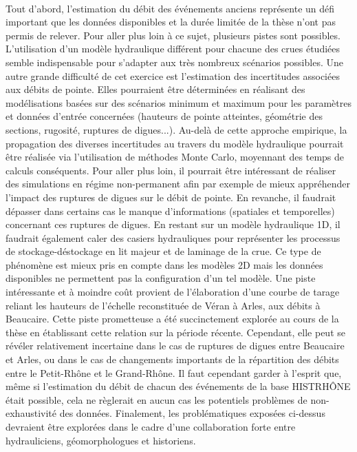 	\paragraph{} Tout d'abord, l'estimation du débit des événements anciens représente un défi important que les données disponibles et la durée limitée de la thèse n'ont pas permis de relever. Pour aller plus loin à ce sujet, plusieurs pistes sont possibles. L'utilisation d'un modèle hydraulique différent pour chacune des crues étudiées semble indispensable pour s'adapter aux très nombreux scénarios possibles. Une autre grande difficulté de cet exercice est l'estimation des incertitudes associées aux débits de pointe. Elles pourraient être déterminées en réalisant des modélisations basées sur des scénarios minimum et maximum pour les paramètres et données d'entrée concernées (hauteurs de pointe atteintes, géométrie des sections, rugosité, ruptures de digues...). Au-delà de cette approche empirique, la propagation des diverses incertitudes au travers du modèle hydraulique pourrait être réalisée via l'utilisation de méthodes Monte Carlo, moyennant des temps de calculs conséquents. Pour aller plus loin, il pourrait être intéressant de réaliser des simulations en régime non-permanent afin par exemple de mieux appréhender l'impact des ruptures de digues sur le débit de pointe. En revanche, il faudrait dépasser dans certains cas le manque d'informations (spatiales et temporelles) concernant ces ruptures de digues. En restant sur un modèle hydraulique 1D, il faudrait également caler des casiers hydrauliques pour représenter les processus de stockage-déstockage en lit majeur et de laminage de la crue. Ce type de phénomène est mieux pris en compte dans les modèles 2D mais les données disponibles ne permettent pas la configuration d'un tel modèle. Une piste intéressante et à moindre coût provient de l'élaboration d'une courbe de tarage reliant les hauteurs de l'échelle reconstituée de Véran à Arles, aux débits à Beaucaire. Cette piste prometteuse a été succinctement explorée au cours de la thèse en établissant cette relation sur la période récente. Cependant, elle peut se révéler relativement incertaine dans le cas de ruptures de digues entre Beaucaire et Arles, ou dans le cas de changements importants de la répartition des débits entre le Petit-Rhône et le Grand-Rhône. Il faut cependant garder à l'esprit que, même si l'estimation du débit de chacun des événements de la base HISTRHÔNE était possible, cela ne règlerait en aucun cas les potentiels problèmes de non-exhaustivité des données. Finalement, les problématiques exposées ci-dessus devraient être explorées dans le cadre d'une collaboration forte entre hydrauliciens, géomorphologues et historiens.
	
